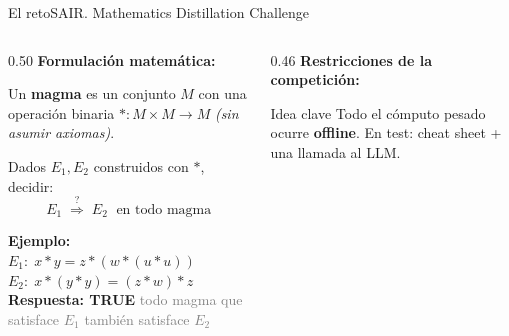 \documentclass[aspectratio=169,10pt]{beamer}
\newcommand{\cy}[1]{\textcolor{AccentBlue}{\textbf{#1}}}
\newcommand{\gn}[1]{\textcolor{AccentGreen}{\textbf{#1}}}
\begin{document}
\begin{frame}{El reto}{SAIR. Mathematics Distillation Challenge}
  \begin{columns}[T,onlytextwidth]
    \begin{column}{0.50\textwidth}
      \vspace{4mm}
      \cy{Formulación matemática:}
      \vspace{3mm}

      Un \textbf{magma} es un conjunto $M$ con una operación binaria
      ${\ast}:M\!\times\!M\to M$ \textit{(sin asumir axiomas)}.

      \vspace{4mm}
      Dados $E_1, E_2$ construidos con $\ast$, decidir:
      \[
        \boxed{\;E_1 \;\overset{?}{\Longrightarrow}\; E_2
          \;\text{ en todo magma}\;}
      \]

      \vspace{4mm}
      \textbf{Ejemplo:}\\[3pt]
      $E_1{:}\; x \ast y = z \ast (w \ast (u \ast u))$\\[2pt]
      $E_2{:}\; x \ast (y \ast y) = (z \ast w) \ast z$\\[4pt]
      \gn{Respuesta: TRUE}
      \hfill\textcolor{gray}{\tiny todo magma que satisface $E_1$ también satisface $E_2$}
    \end{column}
    \hfill
    \begin{column}{0.46\textwidth}
      \vspace{2mm}
      \cy{Restricciones de la competición:}
      \vspace{2mm}


      \vspace{4mm}
      \begin{block}{Idea clave}
        Todo el cómputo pesado ocurre \textbf{offline}.
        En test: cheat sheet + una llamada al LLM.
      \end{block}
    \end{column}
  \end{columns}
\end{frame}
\end{document}
